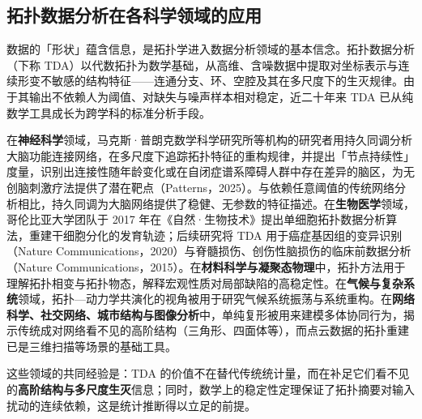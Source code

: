 \documentclass[12pt,a4paper]{ctexart}
\begin{document}
\subsection{拓扑数据分析在各科学领域的应用}
数据的「形状」蕴含信息，是拓扑学进入数据分析领域的基本信念。拓扑数据分析（下称 TDA）以代数拓扑为数学基础，从高维、含噪数据中提取对坐标表示与连续形变不敏感的结构特征——连通分支、环、空腔及其在多尺度下的生灭规律。由于其输出不依赖人为阈值、对缺失与噪声样本相对稳定，近二十年来 TDA 已从纯数学工具成长为跨学科的标准分析手段。\par
在\textbf{神经科学}领域，马克斯·普朗克数学科学研究所等机构的研究者用持久同调分析大脑功能连接网络，在多尺度下追踪拓扑特征的重构规律，并提出「节点持续性」度量，识别出连接性随年龄变化或在自闭症谱系障碍人群中存在差异的脑区，为无创脑刺激疗法提供了潜在靶点（Patterns，2025）。与依赖任意阈值的传统网络分析相比，持久同调为大脑网络提供了稳健、无参数的特征描述。在\textbf{生物医学}领域，哥伦比亚大学团队于 2017 年在《自然·生物技术》提出单细胞拓扑数据分析算法，重建干细胞分化的发育轨迹；后续研究将 TDA 用于癌症基因组的变异识别（Nature Communications，2020）与脊髓损伤、创伤性脑损伤的临床前数据分析（Nature Communications，2015）。在\textbf{材料科学与凝聚态物理}中，拓扑方法用于理解拓扑相变与拓扑物态，解释宏观性质对局部缺陷的高稳定性。在\textbf{气候与复杂系统}领域，拓扑—动力学共演化的视角被用于研究气候系统振荡与系统重构。在\textbf{网络科学、社交网络、城市结构与图像分析}中，单纯复形被用来建模多体协同行为，揭示传统成对网络看不见的高阶结构（三角形、四面体等），而点云数据的拓扑重建已是三维扫描等场景的基础工具。\par
这些领域的共同经验是：TDA 的价值不在替代传统统计量，而在补足它们看不见的\textbf{高阶结构与多尺度生灭}信息；同时，数学上的稳定性定理保证了拓扑摘要对输入扰动的连续依赖，这是统计推断得以立足的前提。\par
\end{document}
